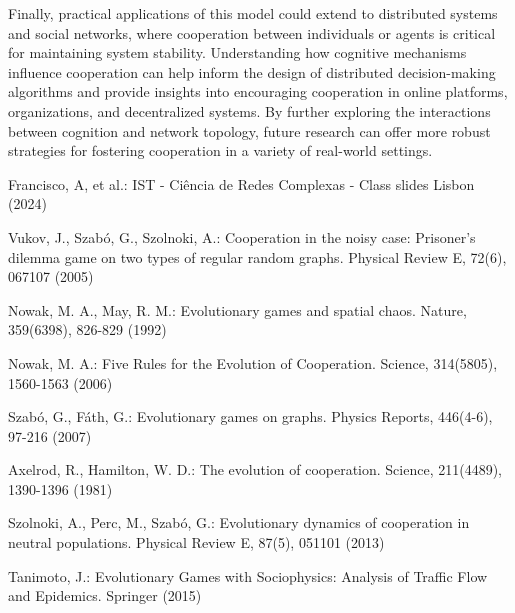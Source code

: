 \documentclass[runningheads]{llncs}
\begin{document}
Finally, practical applications of this model could extend to distributed systems and social networks, where cooperation between individuals or agents is critical for maintaining system stability. Understanding how cognitive mechanisms influence cooperation can help inform the design of distributed decision-making algorithms and provide insights into encouraging cooperation in online platforms, organizations, and decentralized systems. By further exploring the interactions between cognition and network topology, future research can offer more robust strategies for fostering cooperation in a variety of real-world settings.

%
%
% 
% 
%
\begin{thebibliography}{8}
Francisco, A, et al.: IST - Ciência de Redes Complexas - Class slides
Lisbon (2024)


Vukov, J., Szabó, G., Szolnoki, A.: Cooperation in the noisy case: Prisoner's dilemma game on two types of regular random graphs. Physical Review E, 72(6), 067107 (2005)

Nowak, M. A., May, R. M.: Evolutionary games and spatial chaos. Nature, 359(6398), 826-829 (1992)

Nowak, M. A.: Five Rules for the Evolution of Cooperation. Science, 314(5805), 1560-1563 (2006)

Szabó, G., Fáth, G.: Evolutionary games on graphs. Physics Reports, 446(4-6), 97-216 (2007)

Axelrod, R., Hamilton, W. D.: The evolution of cooperation. Science, 211(4489), 1390-1396 (1981)

Szolnoki, A., Perc, M., Szabó, G.: Evolutionary dynamics of cooperation in neutral populations. Physical Review E, 87(5), 051101 (2013)

Tanimoto, J.: Evolutionary Games with Sociophysics: Analysis of Traffic Flow and Epidemics. Springer (2015)

\end{thebibliography}
\end{document}
